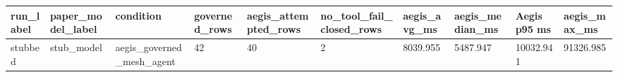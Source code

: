 \begin{tabular}{llllllllll}
 \hline
run\_label & paper\_model\_label & condition & governed\_rows & aegis\_attempted\_rows & no\_tool\_fail\_closed\_rows & aegis\_avg\_ms & aegis\_median\_ms & Aegis p95 ms & aegis\_max\_ms \\
 \hline
stubbed & stub\_model & aegis\_governed\_mesh\_agent & 42 & 40 & 2 & 8039.955 & 5487.947 & 10032.941 & 91326.985 \\
 \hline
\end{tabular}
